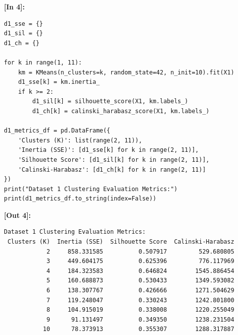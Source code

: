 \vspace{0.4em}
\noindent\textbf{\small [In 4]:}
\begin{lstlisting}[style=pycode]
d1_sse = {}
d1_sil = {}
d1_ch = {}

for k in range(1, 11):
    km = KMeans(n_clusters=k, random_state=42, n_init=10).fit(X1)
    d1_sse[k] = km.inertia_
    if k >= 2:
        d1_sil[k] = silhouette_score(X1, km.labels_)
        d1_ch[k] = calinski_harabasz_score(X1, km.labels_)

d1_metrics_df = pd.DataFrame({
    'Clusters (K)': list(range(2, 11)),
    'Inertia (SSE)': [d1_sse[k] for k in range(2, 11)],
    'Silhouette Score': [d1_sil[k] for k in range(2, 11)],
    'Calinski-Harabasz': [d1_ch[k] for k in range(2, 11)]
})
print("Dataset 1 Clustering Evaluation Metrics:")
print(d1_metrics_df.to_string(index=False))
\end{lstlisting}
\noindent\textbf{\small [Out 4]:}
\begin{lstlisting}[style=output]
Dataset 1 Clustering Evaluation Metrics:
 Clusters (K)  Inertia (SSE)  Silhouette Score  Calinski-Harabasz
            2     858.331585          0.507917         529.680805
            3     449.604175          0.625396         776.117969
            4     184.323583          0.646824        1545.886454
            5     160.688873          0.530433        1349.593082
            6     138.307767          0.426666        1271.504629
            7     119.248047          0.330243        1242.801800
            8     104.915019          0.338008        1220.255049
            9      91.131497          0.349350        1238.231504
           10      78.373913          0.355307        1288.317887
\end{lstlisting}

